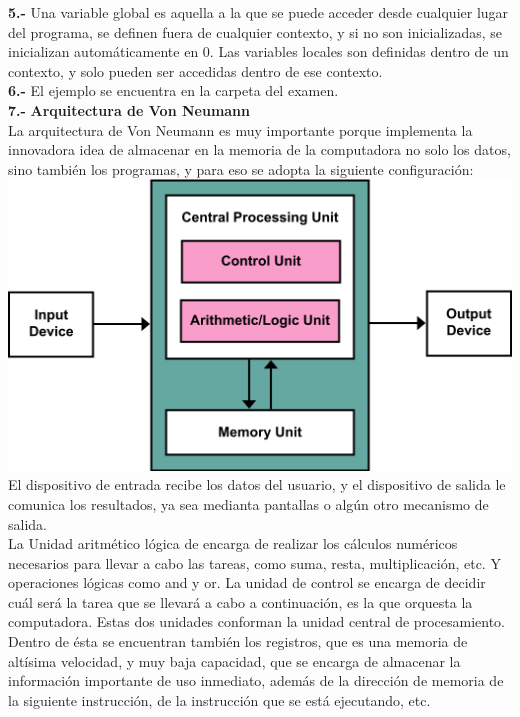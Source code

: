 \documentclass{article}
\begin{document}
\textbf{5.-} Una variable global es aquella a la que se puede acceder desde cualquier lugar del programa, se definen fuera de cualquier contexto, y si no son inicializadas, se inicializan automáticamente en $0$. Las variables locales son definidas dentro de un contexto, y solo pueden ser accedidas dentro de ese contexto.\\

\textbf{6.-} El ejemplo se encuentra en la carpeta del examen.\\

\textbf{7.-} \textbf{Arquitectura de Von Neumann}\\

La arquitectura de Von Neumann es muy importante porque implementa la innovadora idea de almacenar en la memoria de la computadora no solo los datos, sino también los programas, y para eso se adopta la siguiente configuración: \\

\includegraphics[width = \textwidth]{von}\\

El dispositivo de entrada recibe los datos del usuario, y el dispositivo de salida le comunica los resultados, ya sea medianta pantallas o algún otro mecanismo de salida.\\

La Unidad aritmético lógica de encarga de realizar los cálculos numéricos necesarios para llevar a cabo las tareas, como suma, resta, multiplicación, etc. Y operaciones lógicas como and y or. La unidad de control se encarga de decidir cuál será la tarea que se llevará a cabo a continuación, es la que orquesta la computadora. Estas dos unidades conforman la unidad central de procesamiento. Dentro de ésta se encuentran también los registros, que es una memoria de altísima velocidad, y muy baja capacidad, que se encarga de almacenar la información importante de uso inmediato, además de la dirección de memoria de la siguiente instrucción, de la instrucción que se está ejecutando, etc.\\
\end{document}
